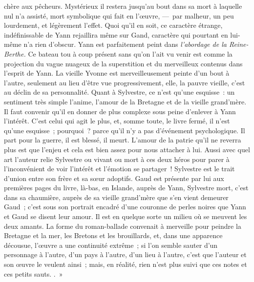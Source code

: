 \documentclass[french,twoside]{book} %
\begin{document}
{chère aux pêcheurs. Mystérieux il restera jusqu’au bout dans sa mort à laquelle nul n’a assisté, mort symbolique qui fait en l’œuvre, — par malheur, un peu lourdement, et légèrement l’effet. Quoi qu’il en soit, ce caractère étrange, indéfinissable de Yann rejaillira même sur Gand, caractère qui pourtant en lui-même n’a rien d’obscur. Yann est parfaitement peint dans \emph{l’abordage de la Reine-Berthe.} Ce bateau tou à coup présent sans qu’on l’ait vu venir est comme la projection du vague nuageux de la superstition et du merveilleux contenus dans l’esprit de Yann. La vieille Yvonne est merveilleusement peinte d’un bout à l’autre, seulement au lieu d’être vue progressivement, elle, la pauvre vieille, c’est au déclin de sa personnalité. Quant à Sylvestre, ce n’est qu’une esquisse : un sentiment très simple l’anime, l’amour de la Bretagne et de la vieille grand’mère. Il faut convenir qu’il en donner de plus complexe sous peine d’enlever à Yann l’intérêt. C’est celui qui agit le plus, et, somme toute, le livre fermé, il n’est qu’une esquisse ; pourquoi ? parce qu’il n’y a pas d’événement psychologique. Il part pour la guerre, il est blessé, il meurt. L’amour de la patrie qu’il ne reverra plus est que l’enjeu et cela est bien assez pour nous attacher à lui. Aussi avec quel art l’auteur relie Sylvestre ou vivant ou mort à ces deux héros pour parer à l’inconvénient de voir l’intérêt et l’émotion se partager ! Sylvestre est le trait d’union entre son frère et sa sœur adoptifs. Gaud est présente par lui aux premières pages du livre, là-bas, en Islande, auprès de Yann, Sylvestre mort, c’est dans sa chaumière, auprès de sa vieille grand’mère que s’en vient demeurer Gaud ; c’est sous son portrait encadré d’une couronne de perles noires que Yann et Gaud se disent leur amour. Il est en quelque sorte un milieu où se meuvent les deux amants. La forme du roman-ballade convenait à merveille pour peindre la Bretagne et la mer, les Bretons et les brouillards, et, dans une apparence décousue, l’œuvre a une continuité extrême ; si l’on semble sauter d’un personnage à l’autre, d’un pays à l’autre, d’un lieu à l’autre, c’est que l’auteur et son œuvre le veulent ainsi ; mais, en réalité, rien n’est plus suivi que ces notes et ces petits sauts.
}. »\par
\end{document}
